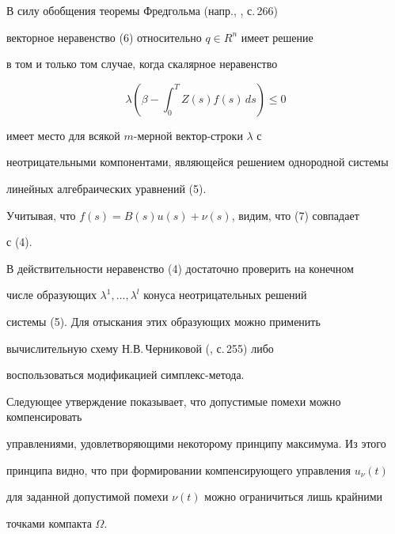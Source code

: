 \begin{pf}
В силу обобщения теоремы Фредгольма (напр., \cite{7}, с.\,266)


векторное неравенство (6) относительно $q\in R^n$ имеет решение


в том и только том случае, когда скалярное неравенство


\begin{equation}


\lambda(\beta - \int_0^T Z(s)f(s)\,ds) \le 0 


\end{equation}


имеет место для всякой $m$-мерной вектор-строки $\lambda$ с


неотрицательными компонентами, являющейся решением однородной системы


линейных алгебраических уравнений (5).


Учитывая, что $f(s) = B(s)u(s) + \nu(s)$, видим, что (7) совпадает


с (4).


\end{pf}





\begin{note}


В действительности неравенство (4) достаточно проверить на конечном


числе образующих $\lambda^1,\dotsc,\lambda^l$ конуса неотрицательных решений


системы (5). Для отыскания этих образующих можно применить


вычислительную схему Н.В.\,Черниковой (\cite{8}, с.\,255) либо


воспользоваться модификацией симплекс-метода.


\end{note}





Следующее утверждение показывает, что допустимые помехи можно компенсировать


управлениями, удовлетворяющими некоторому принципу максимума. Из этого


принципа видно, что при формировании компенсирующего управления $u_\nu(t)$


для заданной допустимой помехи $\nu(t)$ можно ограничиться лишь крайними


точками компакта $\Omega$.





